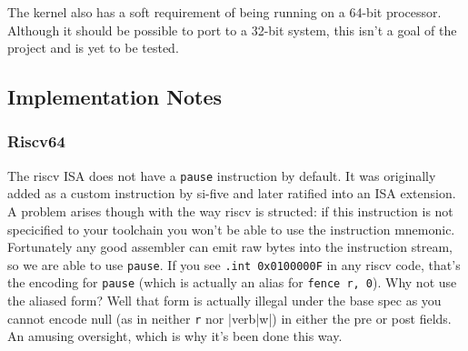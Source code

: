 The kernel also has a soft requirement of being running on a 64-bit processor. Although it should be possible to port to a 32-bit system, this isn't a goal of the project and is yet to be tested.

\subsection{Implementation Notes}

\subsubsection{Riscv64}
The riscv ISA does not have a \verb|pause| instruction by default. It was originally added as a custom instruction by si-five and later ratified into an ISA extension. A problem arises though with the way riscv is structed: if this instruction is not specicified to your toolchain you won't be able to use the instruction mnemonic. Fortunately any good assembler can emit raw bytes into the instruction stream, so we are able to use \verb|pause|. If you see \verb|.int 0x0100000F| in any riscv code, that's the encoding for \verb|pause| (which is actually an alias for \verb|fence r, 0|). Why not use the aliased form? Well that form is actually illegal under the base spec as you cannot encode null (as in neither \verb|r| nor |verb|w|) in either the pre or post fields. An amusing oversight, which is why it's been done this way.

